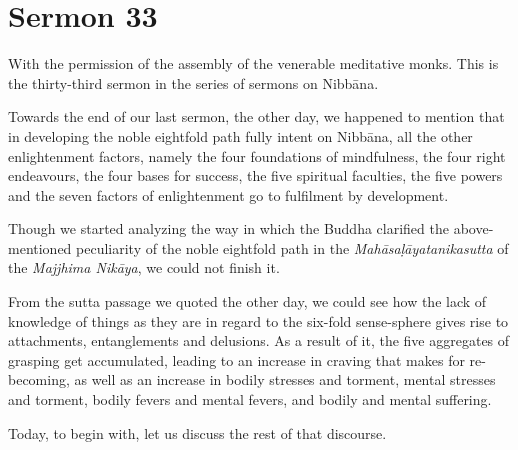 \chapter{Sermon 33}

\NibbanaOpeningQuote

With the permission of the assembly of the venerable meditative monks. This is the thirty-third sermon in the series of sermons on Nibbāna.

Towards the end of our last sermon, the other day, we happened to mention that in developing the noble eightfold path fully intent on Nibbāna, all the other enlightenment factors, namely the four foundations of mindfulness, the four right endeavours, the four bases for success, the five spiritual faculties, the five powers and the seven factors of enlightenment go to fulfilment by development.

Though we started analyzing the way in which the Buddha clarified the above-mentioned peculiarity of the noble eightfold path in the \emph{Mahāsaḷāyatanikasutta} of the \emph{Majjhima Nikāya}, we could not finish it.

From the sutta passage we quoted the other day, we could see how the lack of knowledge of things as they are in regard to the six-fold sense-sphere gives rise to attachments, entanglements and delusions. As a result of it, the five aggregates of grasping get accumulated, leading to an increase in craving that makes for re-becoming, as well as an increase in bodily stresses and torment, mental stresses and torment, bodily fevers and mental fevers, and bodily and mental suffering.

Today, to begin with, let us discuss the rest of that discourse.

